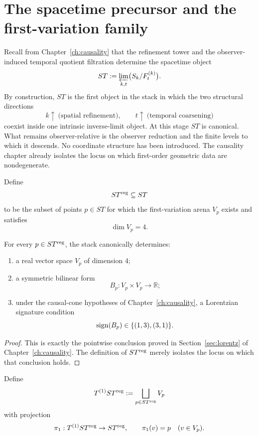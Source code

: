 \section{The spacetime precursor and the first-variation family}
\label{sec:connection-precursor}
Recall from Chapter~\ref{ch:causality} that the refinement tower and the
observer-induced temporal quotient filtration determine the spacetime
object
\[
	ST:=\varprojlim_{k,t}\bigl(S_k/F_t^{(k)}\bigr).
\]
By construction, \(ST\) is the first object in the stack in which the
two structural directions
\[
	k\uparrow\ \text{(spatial refinement)},
	\qquad
	t\uparrow\ \text{(temporal coarsening)}
\]
coexist inside one intrinsic inverse-limit object.
At this stage \(ST\) is canonical.  What remains observer-relative is
the observer reduction and the finite levels to which it descends.  No
coordinate structure has been introduced.
The causality chapter already isolates the locus on which first-order
geometric data are nondegenerate.
\begin{definition}
	Define
	\[
		ST^{\mathrm{reg}}\subseteq ST
	\]
	to be the subset of points \(p\in ST\) for which the first-variation
	arena \(V_p\) exists and satisfies
	\[
		\dim V_p=4.
	\]
\end{definition}
\begin{proposition}
	\label{prop:connection-pointwise}
	For every \(p\in ST^{\mathrm{reg}}\), the stack canonically determines:
	\begin{enumerate}[label=\textup{(\roman*)}]
		\item
		      a real vector space \(V_p\) of dimension \(4\);
		\item
		      a symmetric bilinear form
		      \[
			      B_p:V_p\times V_p\to\mathbb R;
		      \]
		\item
		      under the causal-cone hypotheses of Chapter~\ref{ch:causality}, a
		      Lorentzian signature condition
		      \[
			      \operatorname{sign}(B_p)\in\{(1,3),(3,1)\}.
		      \]
	\end{enumerate}
\end{proposition}
\begin{proof}
	This is exactly the pointwise conclusion proved in
	Section~\ref{sec:lorentz} of Chapter~\ref{ch:causality}.  The
	definition of \(ST^{\mathrm{reg}}\) merely isolates the locus on which that
	conclusion holds.
\end{proof}
\begin{definition}
	\label{def:connection-first-bundle}
	Define
	\[
		T^{(1)}ST^{\mathrm{reg}}
		:=
		\bigsqcup_{p\in ST^{\mathrm{reg}}}V_p
	\]
	with projection
	\[
		\pi_1:T^{(1)}ST^{\mathrm{reg}}\to ST^{\mathrm{reg}},
		\qquad
		\pi_1(v)=p
		\quad (v\in V_p).
	\]
\end{definition}
